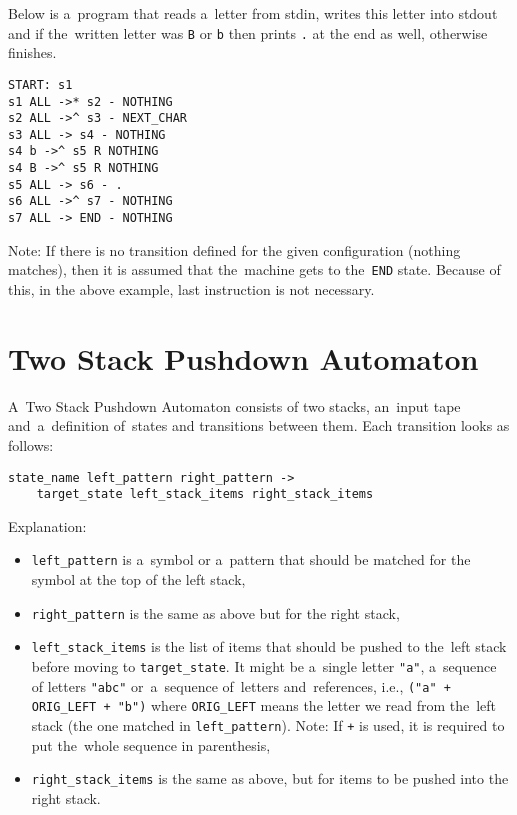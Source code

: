 \documentclass[english,shortabstract,mgr]{iithesis}
\begin{document}
Below is a~program that reads a~letter from stdin, writes this letter into
stdout and if the~written letter was \texttt{B} or \texttt{b} then prints
\texttt{.} at the end as well, otherwise finishes.

\begin{verbatim}
START: s1
s1 ALL ->* s2 - NOTHING
s2 ALL ->^ s3 - NEXT_CHAR
s3 ALL -> s4 - NOTHING
s4 b ->^ s5 R NOTHING
s4 B ->^ s5 R NOTHING
s5 ALL -> s6 - .
s6 ALL ->^ s7 - NOTHING
s7 ALL -> END - NOTHING
\end{verbatim}

Note: If there is no transition defined for the given configuration
(nothing matches), then it is assumed that the~machine gets to the~\texttt{END} state.
Because of this, in the above example, last instruction is not necessary.

\section {Two Stack Pushdown Automaton}

A~Two Stack Pushdown Automaton consists of two stacks, an~input tape and~a~definition
of~states and transitions between them. Each transition looks as follows:
\begin{verbatim}
state_name left_pattern right_pattern ->
    target_state left_stack_items right_stack_items
\end{verbatim}

Explanation:
\begin{itemize}
  \item \texttt{left\_pattern} is a~symbol or a~pattern that should be matched
      for the symbol at the top of the left stack,
  \item \texttt{right\_pattern} is the same as above but for the right stack,
  \item \texttt{left\_stack\_items} is the list of items that should be pushed
      to the~left stack before moving to \texttt{target\_state}. It might be
      a~single letter \texttt{"a"}, a~sequence of letters \texttt{"abc"}
      or~a~sequence of~letters and~references, i.e., \texttt{("a" + ORIG\_LEFT + "b")}
      where \texttt{ORIG\_LEFT} means the letter we read from the~left stack (the one matched
      in \texttt{left\_pattern}). Note: If \texttt{+} is used, it is required to put
      the~whole sequence in parenthesis,
  \item \texttt{right\_stack\_items} is the same as above, but for items to be pushed into
      the right stack.
\end{itemize}
\end{document}
